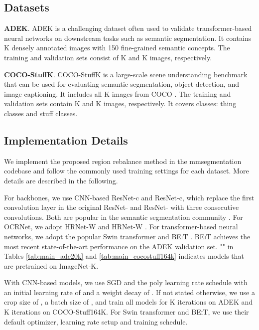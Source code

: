 \documentclass[final]{cvpr}
\begin{document}
\subsection{Datasets}
\vspace{1mm}
\noindent\textbf{ADEK}.
ADEK \cite{zhou2017scene} is a challenging dataset often used to validate transformer-based neural networks on downstream tasks such as semantic segmentation. It contains K densely annotated images with 150 fine-grained semantic concepts. The training and validation sets consist of K and K images, respectively.

\vspace{1mm}
\noindent\textbf{COCO-StuffK}.
COCO-StuffK \cite{caesar2018coco} is a large-scale scene understanding benchmark that can be used for evaluating semantic segmentation, object detection, and image captioning. It includes all K images from COCO . The training and validation sets contain K and K images, respectively. It covers  classes:  thing classes and  stuff classes.


\subsection{Implementation Details}
We implement the proposed region rebalance method in the mmsegmentation codebase \cite{mmseg2020} and follow the commonly used training settings for each dataset. More details are described in the following.


For backbones, we use CNN-based ResNet-c and ResNet-c, which replace the first  convolution layer in the original ResNet- and ResNet- with three consecutive  convolutions. Both are popular in the semantic segmentation community \cite{DBLP:conf/cvpr/ZhaoSQWJ17}. For OCRNet, we adopt HRNet-W and HRNet-W \cite{wang2020deep}. For transformer-based neural networks, we adopt the popular Swin transformer \cite{liu2021swin} and \textsc{BEiT} \cite{bao2021beit}. \textsc{BEiT} achieves the most recent state-of-the-art performance on the ADEK validation set. "" in Tables \ref{tab:main_ade20k} and \ref{tab:main_cocostuff164k} indicates models that are pretrained on ImageNet-K.


With CNN-based models, we use SGD and the poly learning rate schedule \cite{DBLP:conf/cvpr/ZhaoSQWJ17} with an initial learning rate of  and a weight decay of . If not stated otherwise, we use a crop size of , a batch size of , and train all models for K iterations on ADEK and K iterations on COCO-Stuff164K. For Swin transformer and \textsc{BEiT}, we use their default optimizer, learning rate setup and training schedule.  
\end{document}
